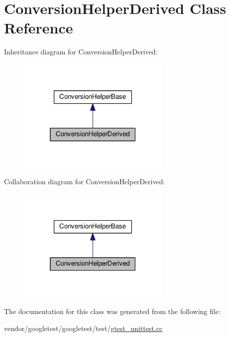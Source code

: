 \hypertarget{classConversionHelperDerived}{}\section{Conversion\+Helper\+Derived Class Reference}
\label{classConversionHelperDerived}


Inheritance diagram for Conversion\+Helper\+Derived\+:
\nopagebreak
\begin{figure}[H]
\begin{center}
\leavevmode
\includegraphics[width=208pt]{classConversionHelperDerived__inherit__graph}
\end{center}
\end{figure}


Collaboration diagram for Conversion\+Helper\+Derived\+:
\nopagebreak
\begin{figure}[H]
\begin{center}
\leavevmode
\includegraphics[width=208pt]{classConversionHelperDerived__coll__graph}
\end{center}
\end{figure}


The documentation for this class was generated from the following file\+:\begin{DoxyCompactItemize}
\item 
vendor/googletest/googletest/test/\hyperlink{gtest__unittest_8cc}{gtest\+\_\+unittest.\+cc}\end{DoxyCompactItemize}
